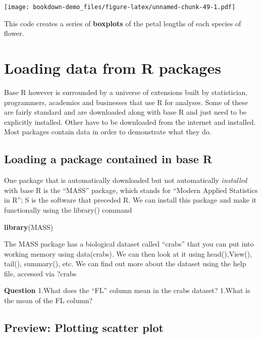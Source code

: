 \documentclass[]{book}
\newenvironment{Shaded}{\begin{snugshade}}{\end{snugshade}}
\newcommand{\KeywordTok}[1]{\textcolor[rgb]{0.13,0.29,0.53}{\textbf{#1}}}
\newcommand{\NormalTok}[1]{#1}
\theoremstyle{definition}
\theoremstyle{definition}
\theoremstyle{definition}
\theoremstyle{remark}
\begin{document}
\texttt{[image: bookdown-demo\_files/figure-latex/unnamed-chunk-49-1.pdf]}

This code creates a series of \textbf{boxplots} of the petal lengths of
each species of flower.

\section{Loading data from R
packages}\label{loading-data-from-r-packages}

Base R however is surrounded by a universe of extensions built by
statistician, programmers, academics and businesses that use R for
analyses. Some of these are fairly standard and are downloaded along
with base R and just need to be explicitly installed. Other have to be
downloaded from the internet and installed. Most packages contain data
in order to demonstrate what they do.

\subsection{Loading a package contained in base
R}\label{loading-a-package-contained-in-base-r}

One package that is automatically downloaded but not automatically
\emph{installed} with base R is the ``MASS'' package, which stands for
``Modern Applied Statistics in R''; S is the software that preceded R.
We can install this package and make it functionally using the library()
command

\begin{Shaded}
\begin{Highlighting}[]
\KeywordTok{library}\NormalTok{(MASS)}
\end{Highlighting}
\end{Shaded}

The MASS package has a biological dataset called ``crabs'' that you can
put into working memory using data(crabs). We can then look at it using
head(),View(), tail(), summary(), etc. We can find out more about the
dataset using the help file, accessed via ?crabs

\textbf{Question} 1.What does the ``FL'' column mean in the crabs
dataset? 1.What is the mean of the FL column?

\subsection{Preview: Plotting scatter
plot}\label{preview-plotting-scatter-plot}
\end{document}
